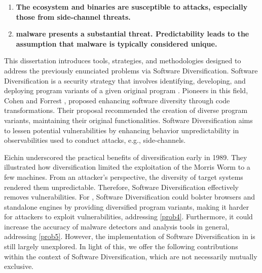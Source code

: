 \begin{enumerate}[label=\textbf{P\arabic*}, ref=\textbf{P\arabic*}]

	\item \label{prob4} \textbf{The \Wasm ecosystem and binaries are susceptible to attacks, especially those from side-channel threats.}
	
	\item \label{prob5} \textbf{\Wasm malware presents a substantial threat.
	Predictability leads to the assumption that malware is typically considered unique.}

\end{enumerate}


\begin{comment}
\msection{Problem statement}

\end{comment}


This dissertation introduces tools, strategies, and methodologies designed to address the previously enunciated problems via Software Diversification.
Software Diversification is a security strategy that involves identifying, developing, and deploying program variants of a given original program \cite{okhravi2013survey}.
Pioneers in this field, Cohen \etal \cite{cohen1993operating} and Forrest \etal \cite{595185}, proposed enhancing software diversity through code transformations. 
Their proposal recommended the creation of diverse program variants, maintaining their original functionalities. 
Software Diversification aims to lessen potential vulnerabilities by enhancing behavior unpredictability in observabilities used to conduct attacks, e.g., side-channels.



Eichin \etal underscored the practical benefits of diversification \cite{36307} early in 1989. 
They illustrated how diversification limited the exploitation of the Morris Worm to a few machines. 
From an attacker's perspective, the diversity of target systems rendered them unpredictable.
Therefore, Software Diversification effectively removes vulnerabilities. 
For \Wasm, Software Diversification could bolster browsers and standalone engines by providing diversified program variants, making it harder for attackers to exploit vulnerabilities, addressing \ref{prob4}. 
Furthermore, it could increase the accuracy of \Wasm malware detectors and \Wasm analysis tools in general, addressing \ref{prob5}. 
However, the implementation of Software Diversification in \Wasm is still largely unexplored. 
In light of this, we offer the following contributions within the context of Software Diversification, which are not necessarily mutually exclusive.


